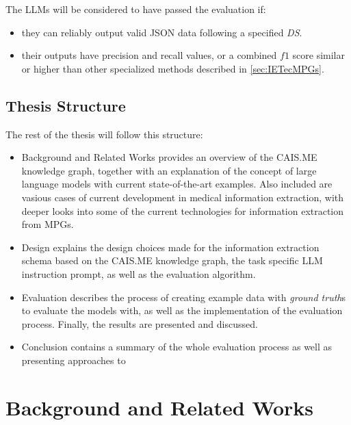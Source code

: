 \documentclass[bs, english]{stthesis}
\begin{document}
The LLMs will be considered to have passed the evaluation if:
\begin{itemize}
  \item they can reliably output valid JSON data following a specified \textit{DS}.
  \item their outputs have precision and recall values, or a combined $f1$ score similar or higher than other specialized methods described in \cref{sec:IETecMPGs}.
\end{itemize}

\section{Thesis Structure}

The rest of the thesis will follow this structure:

\begin{itemize}
  \item {} Background and Related Works provides an overview of the CAIS.ME knowledge graph, together with an explanation of the concept of large language models with current state-of-the-art examples. Also included are vasious cases of current development in medical information extraction, with deeper looks into some of the current technologies for information extraction from MPGs.
  \item {} Design explains the design choices made for the information extraction schema based on the CAIS.ME knowledge graph, the task specific LLM instruction prompt, as well as the evaluation algorithm.
  \item {} Evaluation describes the process of creating example data with \textit{ground truth}s to evaluate the models with, as well as the implementation of the evaluation process. Finally, the results are presented and discussed.
  \item {} Conclusion contains a summary of the whole evaluation process as well as presenting approaches to 
\end{itemize}


\chapter{Background and Related Works}
\label{ch:Background}
\end{document}
